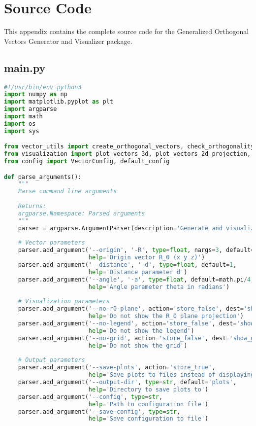 \section{Source Code}

This appendix contains the complete source code for the Generalized Orthogonal Vectors Generator and Visualizer package.

\subsection{main.py}

\begin{lstlisting}[language=Python]
#!/usr/bin/env python3
import numpy as np
import matplotlib.pyplot as plt
import argparse
import math
import os
import sys

from vector_utils import create_orthogonal_vectors, check_orthogonality
from visualization import plot_vectors_3d, plot_vectors_2d_projection, plot_all_projections
from config import VectorConfig, default_config

def parse_arguments():
    """
    Parse command line arguments
    
    Returns:
    argparse.Namespace: Parsed arguments
    """
    parser = argparse.ArgumentParser(description='Generate and visualize orthogonal vectors')
    
    # Vector parameters
    parser.add_argument('--origin', '-R', type=float, nargs=3, default=[0, 0, 0],
                        help='Origin vector R_0 (x y z)')
    parser.add_argument('--distance', '-d', type=float, default=1,
                        help='Distance parameter d')
    parser.add_argument('--angle', '-a', type=float, default=math.pi/4,
                        help='Angle parameter theta in radians')
    
    # Visualization parameters
    parser.add_argument('--no-r0-plane', action='store_false', dest='show_r0_plane',
                        help='Do not show the R_0 plane projection')
    parser.add_argument('--no-legend', action='store_false', dest='show_legend',
                        help='Do not show the legend')
    parser.add_argument('--no-grid', action='store_false', dest='show_grid',
                        help='Do not show the grid')
    
    # Output parameters
    parser.add_argument('--save-plots', action='store_true',
                        help='Save plots to files instead of displaying them')
    parser.add_argument('--output-dir', type=str, default='plots',
                        help='Directory to save plots to')
    parser.add_argument('--config', type=str,
                        help='Path to configuration file')
    parser.add_argument('--save-config', type=str,
                        help='Save configuration to file')
    

\end{lstlisting}

